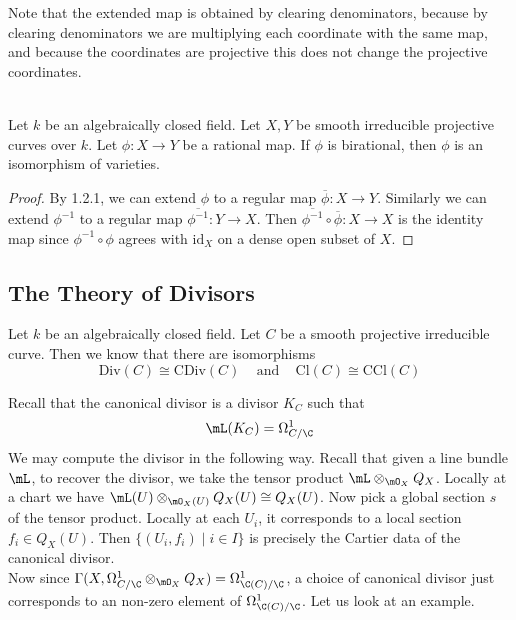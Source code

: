 \documentclass[a4paper]{article}
\begin{document}
Note that the extended map is obtained by clearing denominators, because by clearing denominators we are multiplying each coordinate with the same map, and because the coordinates are projective this does not change the projective coordinates. 

\begin{prp}{}{}\\
Let $k$ be an algebraically closed field. Let $X,Y$ be smooth irreducible projective curves over $k$. Let $\phi:X\to Y$ be a rational map. If $\phi$ is birational, then $\phi$ is an isomorphism of varieties. 
\begin{proof}
By 1.2.1, we can extend $\phi$ to a regular map $\overline{\phi}:X\to Y$. Similarly we can extend $\phi^{-1}$ to a regular map $\overline{\phi^{-1}}:Y\to X$. Then $\overline{\phi^{-1}}\circ\overline{\phi}:X\to X$ is the identity map since $\phi^{-1}\circ\phi$ agrees with $\text{id}_X$ on a dense open subset of $X$. 
\end{proof}
\end{prp}

\subsection{The Theory of Divisors}
Let $k$ be an algebraically closed field. Let $C$ be a smooth projective irreducible curve. Then we know that there are isomorphisms $$\text{Div}(C)\cong\text{CDiv}(C)\;\;\;\text{ and }\;\;\;\text{Cl}(C)\cong\text{CCl}(C)$$ 

Recall that the canonical divisor is a divisor $K_C$ such that $$\mL(K_C)=\Omega_{C/\C}^1$$ We may compute the divisor in the following way. Recall that given a line bundle $\mL$, to recover the divisor, we take the tensor product $\mL\otimes_{\mO_X}Q_X$. Locally at a chart we have $\mL(U)\otimes_{\mO_X(U)}Q_X(U)\cong Q_X(U)$. Now pick a global section $s$ of the tensor product. Locally at each $U_i$, it corresponds to a local section $f_i\in Q_X(U)$. Then $\{(U_i,f_i)\;|\;i\in I\}$ is precisely the Cartier data of the canonical divisor. \\

Now since $\Gamma(X,\Omega_{C/\C}^1\otimes_{\mO_X}Q_X)=\Omega_{\C(C)/\C}^1$, a choice of canonical divisor just corresponds to an non-zero element of $\Omega_{\C(C)/\C}^1$. Let us look at an example. 
\end{document}
